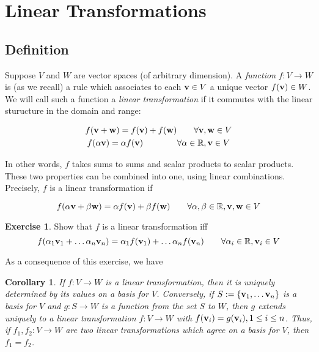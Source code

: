 \documentclass[11pt,notitlepage]{article}
\numberwithin{equation}{section}
\theoremstyle{plain}
\newtheorem{corollary}[equation]{Corollary}
\theoremstyle{definition}
\newtheorem{exercise}[equation]{Exercise}
\begin{document}


\section{Linear Transformations}

\subsection{Definition} Suppose $V$ and $W$ are vector spaces (of arbitrary dimension). A {\it function} $f:V\to W$ is (as we recall) a rule which associates to each ${\bf v}\in V$ a unique vector $f({\bf v})\in W$. We will call such a function a {\it linear transformation} if it commutes with the linear sturucture in the domain and range:

\begin{gather}
f({\bf v} + {\bf w}) = f({\bf v}) + f({\bf w})\qquad\forall {\bf v,w}\in V\\
f(\alpha{\bf v}) = \alpha f({\bf v})\qquad\qquad\forall \alpha\in\mathbb R, {\bf v}\in V
\end{gather}

In other words, $f$ takes sums to sums and scalar products to scalar products. These two properties can be combined into one, using linear combinations. Precisely, $f$ is a linear transformation if

\begin{equation}
f(\alpha{\bf v} + \beta{\bf w}) = \alpha f({\bf v}) + \beta f({\bf w})\qquad\forall \alpha,\beta\in\mathbb R, {\bf v}, {\bf w}\in V
\end{equation}

\begin{exercise} Show that $f$ is a linear transformation iff
\[
f(\alpha_1{\bf v}_1 +\dots \alpha_n{\bf v}_n) = \alpha_1 f({\bf v}_1) +\dots \alpha_n f({\bf v}_n)\qquad\forall \alpha_i\in\mathbb R, {\bf v}_i\in V
\]
\end{exercise}

As a consequence of this exercise, we have

\begin{corollary} If $f: V\to W$ is a linear transformation, then it is uniquely determined by its values on a basis for $V$. Conversely, if $S := \{{\bf v}_1,\dots {\bf v}_n\}$ is a basis for $V$ and $g:S\to W$ is a function from the set $S$ to $W$, then $g$ extends uniquely to a linear transformation $f:V\to W$ with $f({\bf v}_i) = g({\bf v}_i), 1\le i\le n$. Thus, if $f_1, f_2:V\to W$ are two linear transformations which agree on a basis for $V$, then $f_1 = f_2$.
\end{corollary}
\end{document}
